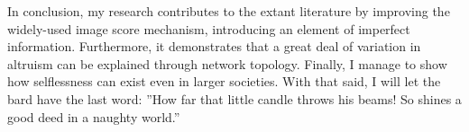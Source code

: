 \documentclass{JASSS}
\begin{document}
In conclusion, my research contributes to the extant literature by improving the widely-used image score mechanism, introducing an element of imperfect information. Furthermore, it demonstrates that a great deal of variation in altruism can be explained through network topology. Finally, I manage to show how selflessness can exist even in larger societies. With that said, I will let the bard \citep{Shakespeare} have the last word: ''How far that little candle throws his beams! So shines a good deed in a naughty world.''







\end{document}
